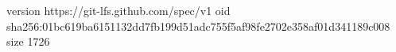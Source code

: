 version https://git-lfs.github.com/spec/v1
oid sha256:01bc619ba6151132dd7fb199d51adc755f5af98fe2702e358af01d341189c008
size 1726
